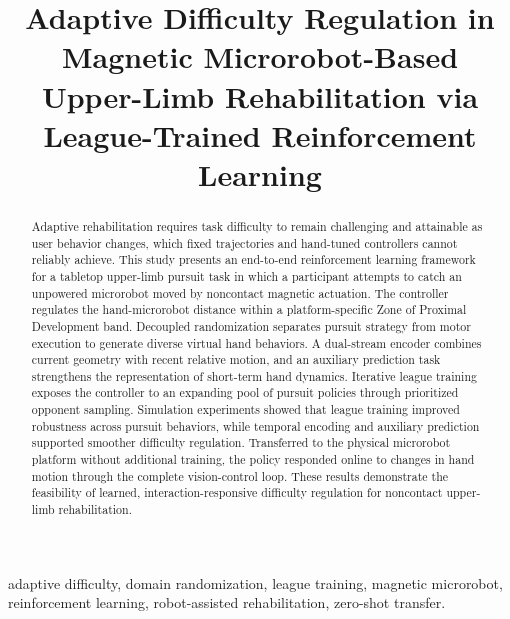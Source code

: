 \documentclass[journal,twoside,web]{ieeecolor2}
\begin{document}
\title{Adaptive Difficulty Regulation in Magnetic Microrobot-Based Upper-Limb Rehabilitation via League-Trained Reinforcement Learning}
\author{}
\maketitle
\begin{abstract}
Adaptive rehabilitation requires task difficulty to remain challenging and attainable as user behavior changes, which fixed trajectories and hand-tuned controllers cannot reliably achieve. This study presents an end-to-end reinforcement learning framework for a tabletop upper-limb pursuit task in which a participant attempts to catch an unpowered microrobot moved by noncontact magnetic actuation. The controller regulates the hand-microrobot distance within a platform-specific Zone of Proximal Development band. Decoupled randomization separates pursuit strategy from motor execution to generate diverse virtual hand behaviors. A dual-stream encoder combines current geometry with recent relative motion, and an auxiliary prediction task strengthens the representation of short-term hand dynamics. Iterative league training exposes the controller to an expanding pool of pursuit policies through prioritized opponent sampling. Simulation experiments showed that league training improved robustness across pursuit behaviors, while temporal encoding and auxiliary prediction supported smoother difficulty regulation. Transferred to the physical microrobot platform without additional training, the policy responded online to changes in hand motion through the complete vision-control loop. These results demonstrate the feasibility of learned, interaction-responsive difficulty regulation for noncontact upper-limb rehabilitation.
\end{abstract}
\begin{IEEEkeywords}
adaptive difficulty, domain randomization, league training, magnetic microrobot, reinforcement learning, robot-assisted rehabilitation, zero-shot transfer.
\end{IEEEkeywords}
\end{document}
